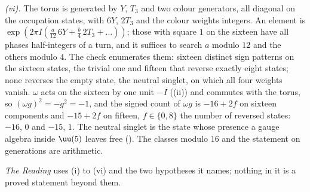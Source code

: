 \emph{(vi).} The torus is generated by $Y$, $T_{3}$ and two colour generators, all diagonal on the occupation states, with $6Y$, $2T_{3}$ and the colour weights integers. An element is $\exp(2\pi I(\tfrac{a}{12}\,6Y + \tfrac{b}{4}\,2T_{3} + \dots))$; those with square $1$ on the sixteen have all phases half-integers of a turn, and it suffices to search $a$ modulo $12$ and the others modulo $4$. The check enumerates them: sixteen distinct sign patterns on the sixteen states, the trivial one and fifteen that reverse exactly eight states; none reverses the empty state, the neutral singlet, on which all four weights vanish. $\omega$ acts on the sixteen by one unit $-I$ ((ii)) and commutes with the torus, so $(\omega g)^{2} = -g^{2} = -1$, and the signed count of $\omega g$ is $-16 + 2f$ on sixteen components and $-15 + 2f$ on fifteen, $f \in \{0, 8\}$ the number of reversed states: $-16$, $0$ and $-15$, $1$. The neutral singlet is the state whose presence a gauge algebra inside $\uu(5)$ leaves free (). The classes modulo $16$ and the statement on generations are arithmetic.

\emph{The Reading} uses (i) to (vi) and the two hypotheses it names; nothing in it is a proved statement beyond them.
